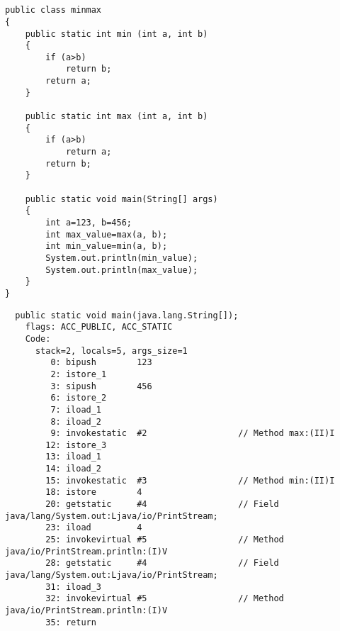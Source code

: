 \section{}


\begin{lstlisting}
public class minmax
{
	public static int min (int a, int b)
	{
		if (a>b)
			return b;
		return a;
	}

	public static int max (int a, int b)
	{
		if (a>b)
			return a;
		return b;
	}

	public static void main(String[] args)
	{
		int a=123, b=456;
		int max_value=max(a, b);
		int min_value=min(a, b);
		System.out.println(min_value);
		System.out.println(max_value);
	}
}
\end{lstlisting}


\begin{lstlisting}
  public static void main(java.lang.String[]);
    flags: ACC_PUBLIC, ACC_STATIC
    Code:
      stack=2, locals=5, args_size=1
         0: bipush        123
         2: istore_1      
         3: sipush        456
         6: istore_2      
         7: iload_1       
         8: iload_2       
         9: invokestatic  #2                  // Method max:(II)I
        12: istore_3      
        13: iload_1       
        14: iload_2       
        15: invokestatic  #3                  // Method min:(II)I
        18: istore        4
        20: getstatic     #4                  // Field java/lang/System.out:Ljava/io/PrintStream;
        23: iload         4
        25: invokevirtual #5                  // Method java/io/PrintStream.println:(I)V
        28: getstatic     #4                  // Field java/lang/System.out:Ljava/io/PrintStream;
        31: iload_3       
        32: invokevirtual #5                  // Method java/io/PrintStream.println:(I)V
        35: return        
\end{lstlisting}


